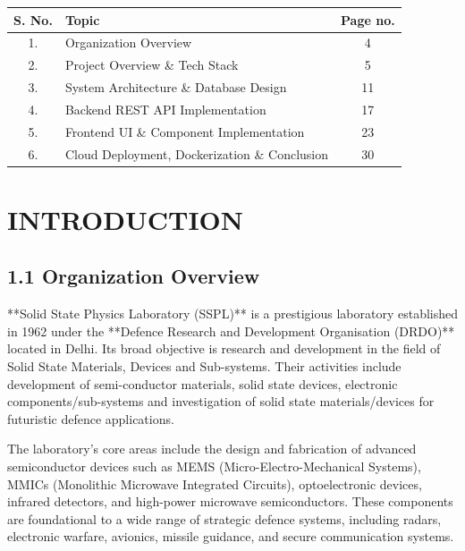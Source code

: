 \documentclass[12pt,a4paper]{article}
\begin{document}
\begin{table}[htbp]
\centering
\large
\renewcommand{\arraystretch}{1.8}
\begin{tabular}{|c|l|c|}
\hline
\textbf{S. No.} & \textbf{Topic} & \textbf{Page no.} \\ \hline
1. & Organization Overview & 4 \\ \hline
2. & Project Overview \& Tech Stack & 5 \\ \hline
3. & System Architecture \& Database Design & 11 \\ \hline
4. & Backend REST API Implementation & 17 \\ \hline
5. & Frontend UI \& Component Implementation & 23 \\ \hline
6. & Cloud Deployment, Dockerization \& Conclusion & 30 \\ \hline
\end{tabular}
\end{table}

\newpage
\section{INTRODUCTION}

\subsection{1.1 Organization Overview}

**Solid State Physics Laboratory (SSPL)** is a prestigious laboratory established in 1962 under the **Defence Research and Development Organisation (DRDO)** located in Delhi. Its broad objective is research and development in the field of Solid State Materials, Devices and Sub-systems. Their activities include development of semi-conductor materials, solid state devices, electronic components/sub-systems and investigation of solid state materials/devices for futuristic defence applications.

The laboratory's core areas include the design and fabrication of advanced semiconductor devices such as MEMS (Micro-Electro-Mechanical Systems), MMICs (Monolithic Microwave Integrated Circuits), optoelectronic devices, infrared detectors, and high-power microwave semiconductors. These components are foundational to a wide range of strategic defence systems, including radars, electronic warfare, avionics, missile guidance, and secure communication systems.
\end{document}
